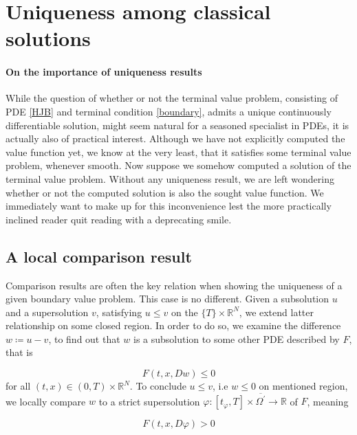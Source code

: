 
\section{Uniqueness among classical solutions}

	\paragraph{On the importance of uniqueness results}
	
	While the question of whether or not the terminal value problem, consisting of PDE \eqref{HJB}  and terminal condition \eqref{boundary}, admits a unique continuously differentiable solution, might seem natural for a seasoned specialist in PDEs, it is actually also of practical interest. Although we have not explicitly computed the value function yet, we know at the very least, that it satisfies some terminal value problem, whenever smooth. Now suppose we somehow computed a solution of the terminal value problem. Without any uniqueness result, we are left wondering whether or not the computed solution is also the sought value function. We immediately want to make up for this inconvenience lest the more practically inclined reader quit reading with a deprecating smile.

	\subsection{A local comparison result}
	
		Comparison results are often the key relation when showing the uniqueness of a given boundary value problem. This case is no different. Given a subsolution $ u $ and a supersolution $ v $, satisfying $ u \leq v $ on the  $ \{ T \} \times \mathbb{R}^N $, we extend latter relationship on some closed region. In order to do so, we examine the difference $ w \coloneqq u - v $, to find out that $ w $ is a subsolution to some other PDE described by $ F $, that is
		
		\begin{equation*}
			F(t, x, Dw) \leq 0
		\end{equation*}
		for all $ (t, x) \in \left(0, T \right) \times \mathbb{R}^N $.
		To conclude $ u \leq v $, i.e $ w \leq 0 $ on mentioned region, we locally compare $ w $ to a strict supersolution $ \varphi : \left[ t_{\varphi}, T \right] \times \overline{\Omega^{\prime}} \to \mathbb{R} $ of $ F $, meaning
		
		\begin{equation*}
			F(t, x, D\varphi) > 0
		\end{equation*}
		
